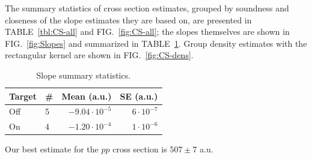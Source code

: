 \documentclass[reprint]{revtex4-1}
\begin{document}
The summary statistics of cross section estimates, grouped by soundness and closeness of the slope estimates they are based on, are presented in TABLE~\ref{tbl:CS-all} and FIG.~\ref{fig:CS-all}; the slopes themselves are shown in FIG.~\ref{fig:Slopes} and summarized in TABLE~\ref{tbl:Slp-big}. Group density estimates with the rectangular kernel are shown in FIG.~\ref{fig:CS-dens}.

\begin{table}
\centering
\caption{Slope summary statistics. \label{tbl:Slp-big}}
\begin{tabular}{llrr}
\hline\hline
Target		& \#		& Mean (a.u.)						& SE (a.u.) \\
\hline
Off			& 5			& $-9.04\cdot 10^{-5}$				& $6\cdot 10^{-7}$  \\
On			& 4			& $-1.20\cdot 10^{-4}$				& $1\cdot 10^{-6}$ \\
\end{tabular}
\end{table}

Our best estimate for the $pp$ cross section is $507 \pm 7$ a.u. 
\end{document}
